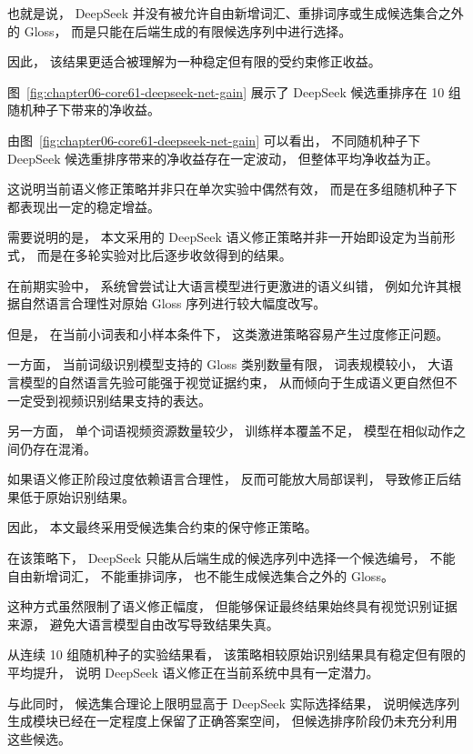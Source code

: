 也就是说，
DeepSeek 并没有被允许自由新增词汇、重排词序或生成候选集合之外的 Gloss，
而是只能在后端生成的有限候选序列中进行选择。

因此，
该结果更适合被理解为一种稳定但有限的受约束修正收益。

图~\ref{fig:chapter06-core61-deepseek-net-gain} 展示了 DeepSeek 候选重排序在 10 组随机种子下带来的净收益。


由图~\ref{fig:chapter06-core61-deepseek-net-gain} 可以看出，
不同随机种子下 DeepSeek 候选重排序带来的净收益存在一定波动，
但整体平均净收益为正。

这说明当前语义修正策略并非只在单次实验中偶然有效，
而是在多组随机种子下都表现出一定的稳定增益。

需要说明的是，
本文采用的 DeepSeek 语义修正策略并非一开始即设定为当前形式，
而是在多轮实验对比后逐步收敛得到的结果。

在前期实验中，
系统曾尝试让大语言模型进行更激进的语义纠错，
例如允许其根据自然语言合理性对原始 Gloss 序列进行较大幅度改写。

但是，
在当前小词表和小样本条件下，
这类激进策略容易产生过度修正问题。

一方面，
当前词级识别模型支持的 Gloss 类别数量有限，
词表规模较小，
大语言模型的自然语言先验可能强于视觉证据约束，
从而倾向于生成语义更自然但不一定受到视频识别结果支持的表达。

另一方面，
单个词语视频资源数量较少，
训练样本覆盖不足，
模型在相似动作之间仍存在混淆。

如果语义修正阶段过度依赖语言合理性，
反而可能放大局部误判，
导致修正后结果低于原始识别结果。

因此，
本文最终采用受候选集合约束的保守修正策略。

在该策略下，
DeepSeek 只能从后端生成的候选序列中选择一个候选编号，
不能自由新增词汇，
不能重排词序，
也不能生成候选集合之外的 Gloss。

这种方式虽然限制了语义修正幅度，
但能够保证最终结果始终具有视觉识别证据来源，
避免大语言模型自由改写导致结果失真。

从连续 10 组随机种子的实验结果看，
该策略相较原始识别结果具有稳定但有限的平均提升，
说明 DeepSeek 语义修正在当前系统中具有一定潜力。

与此同时，
候选集合理论上限明显高于 DeepSeek 实际选择结果，
说明候选序列生成模块已经在一定程度上保留了正确答案空间，
但候选排序阶段仍未充分利用这些候选。

